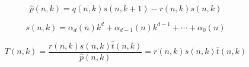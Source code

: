 \begin{equation}
    \hat{p}(n, k)=q(n, k) s(n, k+1)-r(n, k) s(n, k)
\end{equation}

\begin{equation}
    s(n, k)=\alpha_{d}(n) k^{d}+\alpha_{d-1}(n) k^{d-1}+\cdots+\alpha_{0}(n)
\end{equation}

\begin{equation}
    T(n, k)=\frac{r(n, k) s(n, k) \hat{t}(n, k)}{\hat{p}(n, k)}=r(n, k) s(n, k) \bar{t}(n, k)
\end{equation}